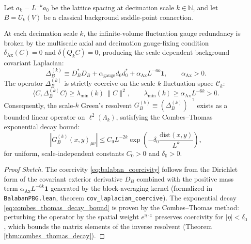 \begin{theorem}
\label{thm:balaban_greens_resolvent}
Let $a_k = L^{-k} a_0$ be the lattice spacing at decimation scale $k \in \mathbb{N}$, and let $B = U_k(V)$ be a classical background saddle-point connection. 

At each decimation scale $k$, the infinite-volume fluctuation gauge redundancy is broken by the multiscale axial and decimation gauge-fixing condition $\delta_{\mathrm{Ax}}(C) = 0$ and $\delta(Q_k C) = 0$, producing the scale-dependent background covariant Laplacian:
\begin{equation}
\label{eq:balaban_laplacian_def}
\Delta_B^{(k)} \equiv D_B^* D_B + \alpha_{\mathrm{gauge}} d_0 d_0^* + \alpha_{\mathrm{Ax}} L^{-6k} \mathbf{1}, \qquad \alpha_{\mathrm{Ax}} > 0.
\end{equation}
The operator $\Delta_B^{(k)}$ is strictly coercive on the scale-$k$ fluctuation space $\mathcal{C}_k$:
\begin{equation}
\label{eq:balaban_coercivity}
\langle C, \Delta_B^{(k)} C \rangle \ge \lambda_{\min}(k) \, \|C\|^2, \qquad \lambda_{\min}(k) \ge \alpha_{\mathrm{Ax}} L^{-6k} > 0.
\end{equation}
Consequently, the scale-$k$ Green's resolvent $G_B^{(k)} \equiv (\Delta_B^{(k)})^{-1}$ exists as a bounded linear operator on $\ell^2(\Lambda_k)$, satisfying the Combes--Thomas exponential decay bound:
\begin{equation}
\label{eq:combes_thomas_decay_bound}
|G_B^{(k)}(x, y)_{\mu\nu}| \le C_0 L^{-2k} \exp\left( -\delta_0 \frac{\mathrm{dist}(x, y)}{L^k} \right),
\end{equation}
for uniform, scale-independent constants $C_0 > 0$ and $\delta_0 > 0$.
\end{theorem}

\begin{proof}[Proof Sketch]
The coercivity \eqref{eq:balaban_coercivity} follows from the Dirichlet form of the covariant exterior derivative $D_B$ combined with the positive mass term $\alpha_{\mathrm{Ax}} L^{-6k} \mathbf{1}$ generated by the block-averaging kernel (formalized in \texttt{BalabanPBG.lean}, theorem \texttt{cov\_laplacian\_coercive}). The exponential decay \eqref{eq:combes_thomas_decay_bound} is proven by the Combes--Thomas method: perturbing the operator by the spatial weight $e^{\eta \cdot x}$ preserves coercivity for $|\eta| < \delta_0$, which bounds the matrix elements of the inverse resolvent (Theorem \ref{thm:combes_thomas_decay}).
\end{proof}

